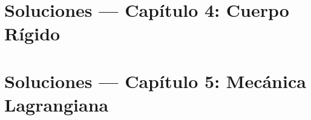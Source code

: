 \section{Soluciones — Capítulo 4: Cuerpo Rígido}


\clearpage

\clearpage

\clearpage

\clearpage

\clearpage

\clearpage

\clearpage

\clearpage

\clearpage

\clearpage

\section{Soluciones — Capítulo 5: Mecánica Lagrangiana}


\clearpage

\clearpage

\clearpage

\clearpage

\clearpage

\clearpage

\clearpage

\clearpage
